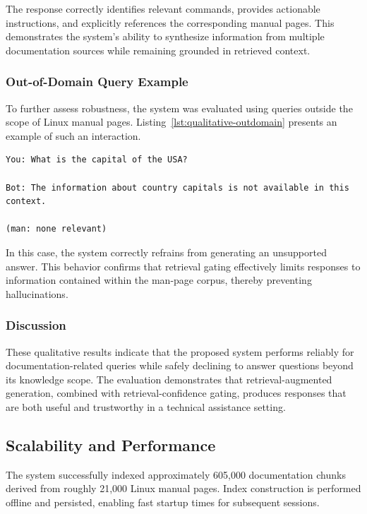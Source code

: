 \documentclass[conference]{IEEEtran}
\begin{document}
The response correctly identifies relevant commands, provides actionable instructions, and explicitly references the corresponding manual pages. This demonstrates the system’s ability to synthesize information from multiple documentation sources while remaining grounded in retrieved context.

\subsubsection{Out-of-Domain Query Example}

To further assess robustness, the system was evaluated using queries outside the scope of Linux manual pages. Listing~\ref{lst:qualitative-outdomain} presents an example of such an interaction.

\begin{lstlisting}[caption={Qualitative evaluation: out-of-domain query}, label={lst:qualitative-outdomain}]
You: What is the capital of the USA?

Bot: The information about country capitals is not available in this
context.

(man: none relevant)
\end{lstlisting}

In this case, the system correctly refrains from generating an unsupported answer. This behavior confirms that retrieval gating effectively limits responses to information contained within the man-page corpus, thereby preventing hallucinations.

\subsubsection{Discussion}

These qualitative results indicate that the proposed system performs reliably for documentation-related queries while safely declining to answer questions beyond its knowledge scope. The evaluation demonstrates that retrieval-augmented generation, combined with retrieval-confidence gating, produces responses that are both useful and trustworthy in a technical assistance setting.

\subsection{Scalability and Performance}

The system successfully indexed approximately 605,000 documentation chunks derived from roughly 21,000 Linux manual pages. Index construction is performed offline and persisted, enabling fast startup times for subsequent sessions.
\end{document}
